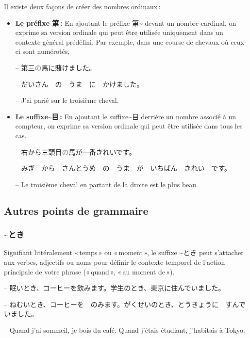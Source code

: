     Il existe deux façons de créer des nombres ordinaux :
    \begin{itemize}
        \item \textbf{Le préfixe 第\~ :} En ajoutant le préfixe 第\~{} devant un nombre cardinal, on exprime sa version ordinale qui peut être utilisée uniquement dans un contexte général prédéfini. Par exemple, dans une course de chevaux où ceux-ci sont numérotés,
        \begin{tcolorbox}
            -- \textcolor{couleurmatiere}{第三}\textcolor{gray}{の}馬に賭けました。

            -- だいさん　の　うま　に　かけました。

            -- J'ai parié sur le troisième cheval.
        \end{tcolorbox}
        \item \textbf{Le suffixe\~{}目 :} En ajoutant le suffixe\~{}目 derrière un nombre associé à un compteur, on exprime sa version ordinale qui peut être utilisée dans tous les cas. 
        \begin{tcolorbox}
            -- 右から\textcolor{couleurmatiere}{三頭目}\textcolor{gray}{の}馬が一番きれいです。

            -- みぎ　から　さんとうめ　の　うま　が　いちばん　きれい　です。

            -- Le troisième cheval en partant de la droite est le plus beau.
        \end{tcolorbox}
    \end{itemize}

    \subsection{Autres points de grammaire}

        \subsubsection{\~{}とき}

        Signifiant littéralement « temps » ou « moment », le suffixe \~{}とき peut s’attacher aux verbes, adjectifs ou noms pour définir le contexte temporel de l’action principale de votre phrase (« quand », « au moment de »).

        \begin{tcolorbox}
            -- 眠いとき、コーヒーを飲みます。学生のとき、東京に住んでいました。

            -- ねむいとき、コーヒーを　のみます。がくせいのとき、とうきょうに　すんでいました。

            -- Quand j'ai sommeil, je bois du café. Quand j'étais étudiant, j'habitais à Tokyo.
        \end{tcolorbox}

